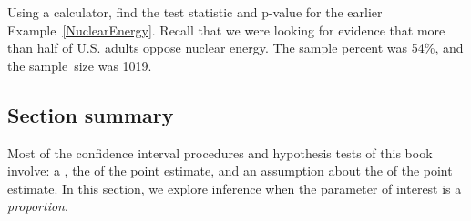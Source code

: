 \begin{exercisewrap}
\begin{nexercise}
Using a calculator, find the test statistic and p-value for the earlier Example~\ref{NuclearEnergy}.  Recall that we were looking for evidence that more than half of U.S. adults oppose nuclear energy.  The sample percent was 54\%, and the sample~size was 1019.\footnotemark
\end{nexercise}
\end{exercisewrap}

\newpage
\subsection*{Section summary}
\noindent Most of the confidence interval procedures and hypothesis tests of this book involve: a , the  of the point estimate, and an assumption about the  of the point estimate. In this section, we explore inference when the parameter of interest is a \emph{proportion}.

